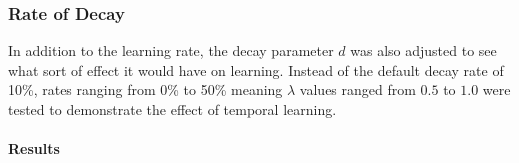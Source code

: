 
\subsubsection{Rate of Decay}
\label{sec:findings-expts-decay}

In addition to the learning rate,
the decay parameter $d$ was also adjusted to see what sort of effect it
would have on learning.
%
Instead of the default decay rate of 10\%,
rates ranging from 0\% to 50\%\textemdash
meaning $\lambda$ values ranged from $0.5$ to $1.0$\textemdash
were tested to demonstrate the effect of temporal learning.

\paragraph{Results}

